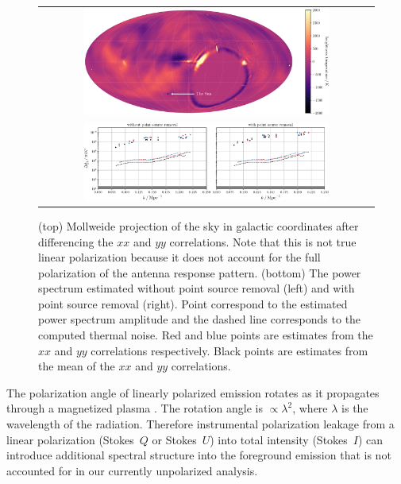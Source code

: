 \begin{bibunit}
\begin{figure}
    \centering
    \begin{tabular}{c}
        \includegraphics[width=0.75\textwidth]{figures/chapter4/xx-yy-sky-map-colorbar}\\
        \includegraphics[width=0.75\textwidth]{figures/chapter4/spherical-power-spectrum-xx-yy}\\
    \end{tabular}
    \caption{
        (top) Mollweide projection of the sky in galactic coordinates after differencing the $xx$
        and $yy$ correlations. Note that this is not true linear polarization because it does not
        account for the full polarization of the antenna response pattern.
        (bottom) The power spectrum estimated without point source removal (left) and with point
        source removal (right). Point correspond to the estimated power spectrum amplitude and the
        dashed line corresponds to the computed thermal noise. Red and blue points are estimates
        from the $xx$ and $yy$ correlations respectively. Black points are estimates from the mean
        of the $xx$ and $yy$ correlations.
    }
    \label{fig:spherical-power-spectrum-xx-yy}
\end{figure}

The polarization angle of linearly polarized emission rotates as it propagates through a magnetized
plasma \citep[e.g.,][]{2014A&A...568A.101J}. The rotation angle is $\propto\lambda^2$, where
$\lambda$ is the wavelength of the radiation. Therefore instrumental polarization leakage from a
linear polarization (Stokes~$Q$ or Stokes~$U$) into total intensity (Stokes~$I$) can introduce
additional spectral structure into the foreground emission that is not accounted for in our
currently unpolarized analysis.


\end{bibunit}
